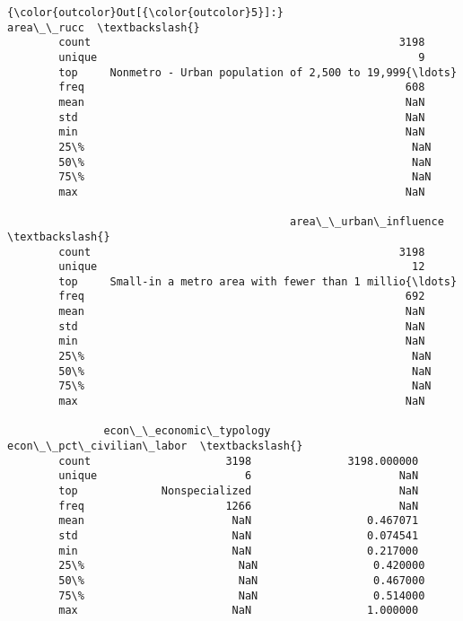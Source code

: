 \documentclass[11pt]{article}
\begin{document}
\begin{Verbatim}[commandchars=\\\{\}]
{\color{outcolor}Out[{\color{outcolor}5}]:}                                                area\_\_rucc  \textbackslash{}
        count                                                3198   
        unique                                                  9   
        top     Nonmetro - Urban population of 2,500 to 19,999{\ldots}   
        freq                                                  608   
        mean                                                  NaN   
        std                                                   NaN   
        min                                                   NaN   
        25\%                                                   NaN   
        50\%                                                   NaN   
        75\%                                                   NaN   
        max                                                   NaN   
        
                                            area\_\_urban\_influence  \textbackslash{}
        count                                                3198   
        unique                                                 12   
        top     Small-in a metro area with fewer than 1 millio{\ldots}   
        freq                                                  692   
        mean                                                  NaN   
        std                                                   NaN   
        min                                                   NaN   
        25\%                                                   NaN   
        50\%                                                   NaN   
        75\%                                                   NaN   
        max                                                   NaN   
        
               econ\_\_economic\_typology  econ\_\_pct\_civilian\_labor  \textbackslash{}
        count                     3198               3198.000000   
        unique                       6                       NaN   
        top             Nonspecialized                       NaN   
        freq                      1266                       NaN   
        mean                       NaN                  0.467071   
        std                        NaN                  0.074541   
        min                        NaN                  0.217000   
        25\%                        NaN                  0.420000   
        50\%                        NaN                  0.467000   
        75\%                        NaN                  0.514000   
        max                        NaN                  1.000000   
        

\end{Verbatim}
\end{document}

